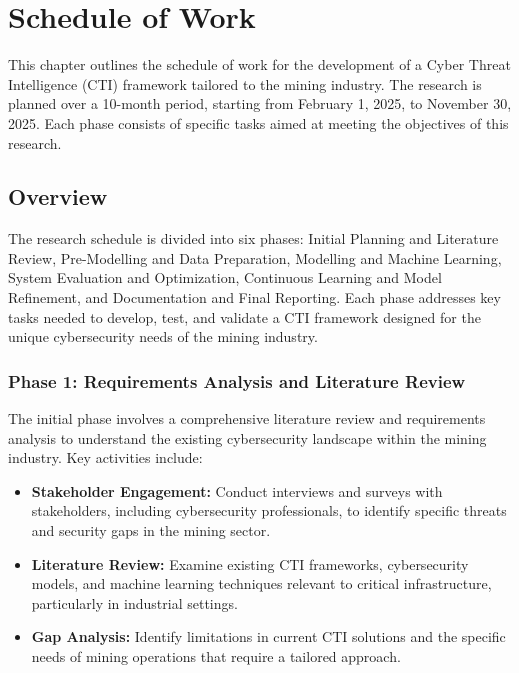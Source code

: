 \documentclass[a4paper,twoside,12pt]{report}
\begin{document}
\chapter{Schedule of Work}

This chapter outlines the schedule of work for the development of a Cyber Threat Intelligence (CTI) framework tailored to the mining industry. The research is planned over a 10-month period, starting from February 1, 2025, to November 30, 2025. Each phase consists of specific tasks aimed at meeting the objectives of this research.

\section{Overview}

The research schedule is divided into six phases: Initial Planning and Literature Review, Pre-Modelling and Data Preparation, Modelling and Machine Learning, System Evaluation and Optimization, Continuous Learning and Model Refinement, and Documentation and Final Reporting. Each phase addresses key tasks needed to develop, test, and validate a CTI framework designed for the unique cybersecurity needs of the mining industry.

\subsection{Phase 1: Requirements Analysis and Literature Review}  
The initial phase involves a comprehensive literature review and requirements analysis to understand the existing cybersecurity landscape within the mining industry. Key activities include:
\begin{itemize}
    \item \textbf{Stakeholder Engagement:} Conduct interviews and surveys with stakeholders, including cybersecurity professionals, to identify specific threats and security gaps in the mining sector.
    \item \textbf{Literature Review:} Examine existing CTI frameworks, cybersecurity models, and machine learning techniques relevant to critical infrastructure, particularly in industrial settings.
    \item \textbf{Gap Analysis:} Identify limitations in current CTI solutions and the specific needs of mining operations that require a tailored approach.
\end{itemize}
\end{document}
